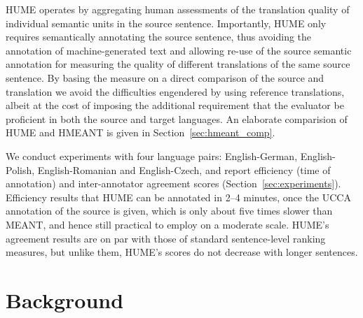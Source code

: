\documentclass[11pt]{article}
\newcommand{\secref}[1]{Section~\ref{#1}}
\newcommand{\bh}[1]{}
\begin{document}
HUME operates by aggregating human assessments of the translation quality of individual
semantic units in the source sentence.
Importantly, HUME only requires semantically annotating the source sentence,
thus avoiding the annotation of machine-generated text 
and allowing re-use of the source semantic annotation for measuring the quality
of different translations of the same source sentence.
By basing the measure on a direct comparison
of the source and translation we avoid the difficulties engendered by using
reference translations, albeit at the cost of imposing the additional requirement
that the evaluator be proficient in both the source and target languages.
An elaborate comparision of HUME and HMEANT is given in \secref{sec:hmeant_comp}.

We conduct experiments with four language pairs: English-German, English-Polish,
English-Romanian and English-Czech, and report efficiency (time of annotation) and
inter-annotator agreement scores (\secref{sec:experiments}). Efficiency results that HUME
can be annotated in 2--4 minutes, once the UCCA annotation of the source is given,
which is only about five times slower than MEANT, and hence still practical to
employ on a moderate scale. HUME's agreement results are on par with those
of standard sentence-level ranking measures, but unlike them,
HUME's scores do not decrease with longer sentences.\bh{We may
  have to focus more on qualitative aspects, if we just try to sell
  the measure on IAA, then the figures are not stunning. OA: is that OK?}



\section{Background}\label{sec:background}

\end{document}
